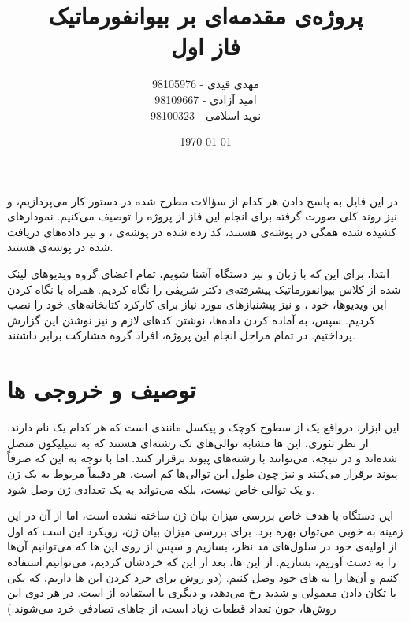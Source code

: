 \documentclass[12pt,onecolumn,a4paper]{article}
\begin{document}
\begin{titlepage}
\title{پروژه‌ی مقدمه‌ای بر بیوانفورماتیک \\ فاز اول} 
\author{مهدی قیدی - 98105976 \\ امید آزادی - 98109667 \\ نوید اسلامی - 98100323}
\date{\today}
\maketitle
\end{titlepage}

در این فایل به پاسخ دادن هر کدام از سؤالات مطرح شده در دستور کار می‌پردازیم، و نیز روند کلی صورت گرفته برای انجام این فاز از پروژه را توصیف می‌کنیم. نمودار‌های کشیده شده همگی در پوشه‌ی  هستند، کد زده شده در پوشه‌ی ، و نیز داده‌های دریافت شده در پوشه‌ی  هستند.

ابتدا، برای این که با زبان  و نیز دستگاه  آشنا شویم، تمام اعضای گروه ویدیوهای لینک شده از کلاس بیوانفورماتیک پیشرفته‌ی دکتر شریفی را نگاه کردیم. همراه با نگاه کردن این ویدیو‌ها، خود ،  و نیز پیشنیاز‌های مورد نیاز برای کارکرد کتابخانه‌های خود را نصب کردیم. سپس، به آماده کردن داده‌ها، نوشتن کد‌های لازم و نیز نوشتن این گزارش پرداختیم. در تمام مراحل انجام این پروژه، افراد گروه مشارکت برابر داشتند.

\section{توصیف و خروجی ها}
این ابزار، درواقع یک  از سطوح کوچک و پیکسل مانندی است که هر کدام یک  نام دارند. از نظر تئوری، این ها مشابه توالی‌های تک رشته‌ای  هستند که به سیلیکون متصل شده‌اند و در نتیجه، می‌توانند با رشته‌های  پیوند برقرار کنند. اما با توجه به این که صرفاً پیوند برقرار می‌کنند و نیز چون طول این توالی‌ها کم است، هر  دقیقاً مربوط به یک ژن و یک توالی خاص نیست، بلکه می‌تواند به یک تعدادی ژن وصل شود.

این دستگاه با هدف خاص بررسی میزان بیان ژن ساخته نشده است، اما از آن در این زمینه به خوبی می‌توان بهره برد. برای بررسی میزان بیان ژن، رویکرد این است که اول از  اولیه‌ی خود در سلول‌های مد نظر،  بسازیم و سپس از روی این ‌ها که می‌توانیم آن‌ها را به دست آوریم،  بسازیم. از این ها، بعد از این که خردشان کردیم، می‌توانیم استفاده کنیم و آن‌ها را به های خود وصل کنیم. (دو روش برای خرد کردن این ها داریم، که یکی با تکان دادن معمولی و شدید رخ می‌دهد، و دیگری با استفاده از  است. در هر دوی این روش‌ها، چون تعداد قطعات زیاد است، از جاهای تصادفی خرد می‌شوند.)
\end{document}
